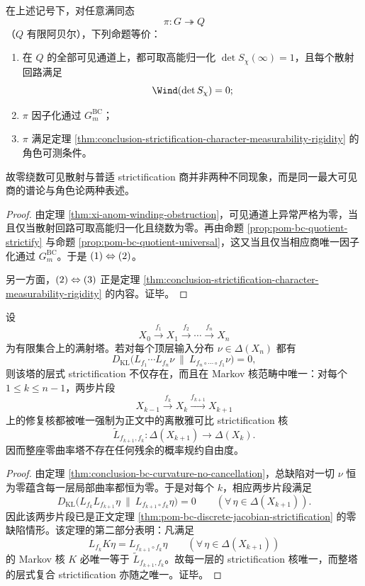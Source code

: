 \begin{corollary}[零绕数可见散射商的精确刻画]\label{cor:conclusion-zero-winding-visible-scattering-exact-strictification}
在上述记号下，对任意满同态
\[
\pi:G\twoheadrightarrow Q
\]
（\(Q\) 有限阿贝尔），下列命题等价：
\begin{enumerate}
  \item 在 \(Q\) 的全部可见通道上，都可取高能归一化 \(\det S_\chi(\infty)=1\)，且每个散射回路满足
  \[
  \Wind(\det S_\chi)=0;
  \]
  \item \(\pi\) 因子化通过 \(G_m^{\mathrm{BC}}\)；
  \item \(\pi\) 满足定理 \ref{thm:conclusion-strictification-character-measurability-rigidity} 的角色可测条件。
\end{enumerate}
故零绕数可见散射与普适 strictification 商并非两种不同现象，而是同一最大可见商的谱论与角色论两种表述。
\end{corollary}
\begin{proof}
由定理 \ref{thm:xi-anom-winding-obstruction}，可见通道上异常严格为零，当且仅当散射回路可取高能归一化且绕数为零。再由命题 \ref{prop:pom-bc-quotient-strictify} 与命题 \ref{prop:pom-bc-quotient-universal}，这又当且仅当相应商唯一因子化通过 \(G_m^{\mathrm{BC}}\)。于是 \(\textup{(1)}\Leftrightarrow\textup{(2)}\)。

另一方面，\(\textup{(2)}\Leftrightarrow\textup{(3)}\) 正是定理 \ref{thm:conclusion-strictification-character-measurability-rigidity} 的内容。证毕。
\end{proof}

\begin{theorem}\label{thm:conclusion-zero-curvature-tower-canonical-strictification-uniqueness}
设
\[
X_0\xrightarrow{f_1}X_1\xrightarrow{f_2}\cdots\xrightarrow{f_n}X_n
\]
为有限集合上的满射塔。若对每个顶层输入分布 \(\nu\in\Delta(X_n)\) 都有
\[
D_{\mathrm{KL}}\!\bigl(L_{f_1}\cdots L_{f_n}\nu\ \|\ L_{f_n\circ\cdots\circ f_1}\nu\bigr)=0,
\]
则该塔的层式 strictification 不仅存在，而且在 Markov 核范畴中唯一：对每个 \(1\le k\le n-1\)，两步片段
\[
X_{k-1}\xrightarrow{f_k}X_k\xrightarrow{f_{k+1}}X_{k+1}
\]
上的修复核都被唯一强制为正文中的离散雅可比 strictification 核
\[
\widetilde L_{f_{k+1},f_k}:\Delta(X_{k+1})\to\Delta(X_k).
\]
因而整座零曲率塔不存在任何残余的概率规约自由度。
\end{theorem}
\begin{proof}
由定理 \ref{thm:conclusion-bc-curvature-no-cancellation}，总缺陷对一切 \(\nu\) 恒为零蕴含每一层局部曲率都恒为零。于是对每个 \(k\)，相应两步片段满足
\[
D_{\mathrm{KL}}\!\bigl(L_{f_k}L_{f_{k+1}}\eta\ \|\ L_{f_{k+1}\circ f_k}\eta\bigr)=0
\qquad(\forall\,\eta\in\Delta(X_{k+1})).
\]
因此该两步片段已是正文定理 \ref{thm:pom-bc-discrete-jacobian-strictification} 的零缺陷情形。该定理的第二部分表明：凡满足
\[
L_{f_k}K\eta=L_{f_{k+1}\circ f_k}\eta
\qquad(\forall\,\eta\in\Delta(X_{k+1}))
\]
的 Markov 核 \(K\) 必唯一等于 \(\widetilde L_{f_{k+1},f_k}\)。故每一层的 strictification 核唯一，而整塔的层式复合 strictification 亦随之唯一。证毕。
\end{proof}

